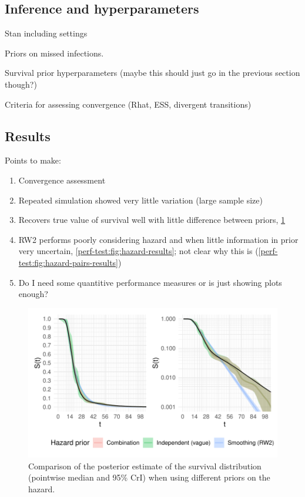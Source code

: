 \documentclass[thesis.tex]{subfiles}
\begin{document}
\subsection{Inference and hyperparameters}

Stan including settings

Priors on missed infections.

Survival prior hyperparameters (maybe this should just go in the previous section though?)

Criteria for assessing convergence (Rhat, ESS, divergent transitions)

\subsection{Results}

Points to make:

\begin{enumerate}
  \item Convergence assessment
  \item Repeated simulation showed very little variation (large sample size)
  \item Recovers true value of survival well with little difference between priors, \cref{perf-test:fig:survival-results}
  \item RW2 performs poorly considering hazard and when little information in prior very uncertain, \cref{perf-test:fig:hazard-results}; not clear why this is (\cref{perf-test:fig:hazard-pairs-results})
  \item Do I need some quantitive performance measures or is just showing plots enough?
\end{enumerate}

\begin{figure}
  \centering \includegraphics{cis-perfect-testing/survival-results}
  \caption[Comparison of survival function estimates under different priors]{Comparison of the posterior estimate of the survival distribution (pointwise median and 95\% CrI) when using different priors on the hazard. \label{perf-test:fig:survival-results}}
\end{figure}
\end{document}
